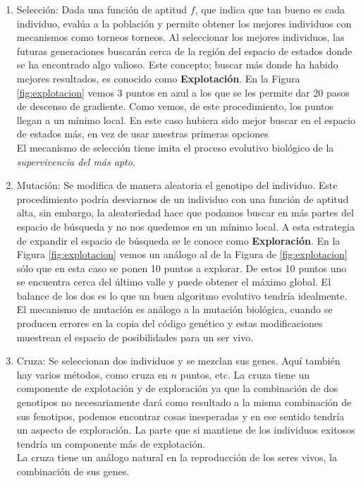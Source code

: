 \begin{enumerate}
    \item Selección: Dada una función de aptitud $f$, que indica que tan bueno es cada individuo, evalúa a la población y permite obtener los mejores individuos con mecanismos como torneos torneos. Al seleccionar los mejores individuos, las futuras generaciones buscarán cerca de la región del espacio de estados donde se ha encontrado algo valioso. Este concepto; buscar más donde ha habido mejores resultados, es conocido como \textbf{Explotación}. En la Figura \ref{fig:explotacion} vemos 3 puntos en azul a los que se les permite dar 20 pasos de descenso de gradiente. Como vemos, de este procedimiento, los puntos llegan a un mínimo local. En este caso hubiera sido mejor buscar en el espacio de estados más, en vez de usar nuestras primeras opciones \\El mecanismo de selección tiene imita el proceso evolutivo biológico de la \emph{supervivencia del más apto}.
    \item Mutación: Se modifica de manera aleatoria el genotipo del individuo. Este procedimiento podría desviarnos de un individuo con una función de aptitud alta, sin embargo, la aleatoriedad hace que podamos buscar en más partes del espacio de búsqueda y no nos quedemos en un mínimo local. A esta estrategia de expandir el espacio de búsqueda se le conoce como \textbf{Exploración}. En la Figura \ref{fig:explotacion} vemos un análogo al de la Figura de \ref{fig:explotacion} sólo que en esta caso se ponen 10 puntos a explorar. De estos 10 puntos uno se encuentra cerca del último valle y puede obtener el máximo global. El balance de los dos es lo que un buen algoritmo evolutivo tendría idealmente. \\ El mecanismo de mutación es análogo a la mutación biológica, cuando se producen errores en la copia del código genético y estas modificaciones muestrean el espacio de posibilidades para un ser vivo.   
    \item Cruza: Se seleccionan dos individuos y se mezclan sus genes. Aquí también hay varios métodos, como cruza en $n$ puntos, etc. La cruza tiene un componente de explotación y de exploración ya que la combinación de dos genotipos no necesariamente dará como resultado a la misma combinación de sus fenotipos, podemos encontrar cosas inesperadas y en ese sentido tendría un aspecto de exploración. La parte que si mantiene de los individuos exitosos tendría un componente más de explotación. \\La cruza tiene un análogo natural en la reproducción de los seres vivos, la combinación de sus genes. 
\end{enumerate}

